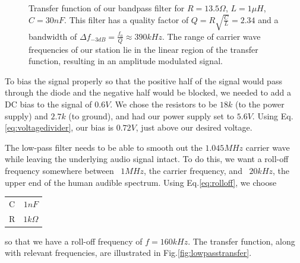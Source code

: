 \documentclass[12pt]{article}
\begin{document}
\begin{figure}[H]
\caption{Transfer function of our bandpass filter for $R =13.5\Omega$, $L=1\mu H$, $C=30nF$. This filter has a quality factor of $Q=R\sqrt{\frac{C}{L}}=2.34$ and a bandwidth of $\Delta f_{-3dB}=\frac{f_0}{Q}\approx 390kHz$. The range of carrier wave frequencies of our station lie in the linear region of the transfer function, resulting in an amplitude modulated signal.}
\label{fig:bandpasstransfer}
\end{figure}

To bias the signal properly so that the positive half of the signal would pass through the diode and the negative half would be blocked, we needed to add a DC bias to the signal of $0.6V$. We chose the resistors to be $18k$ (to the power supply) and $2.7k$ (to ground), and had our power supply set to $5.6V$. Using Eq.\ref{eq:voltagedivider}, our bias is $0.72V$, just above our desired voltage.

The low-pass filter needs to be able to smooth out the $1.045MHz$ carrier wave while leaving the underlying audio signal intact. To do this, we want a roll-off frequency somewhere between ~$1MHz$, the carrier frequency, and ~$20kHz$, the upper end of the human audible spectrum. Using Eq.\ref{eq:rolloff}, we choose

\begin{center}
  \begin{tabular}{ c  c }
    C & $1nF$ \\
    R & $1k\Omega$ 
  \end{tabular}
\end{center}
so that we have a roll-off frequency of $f=160kHz$. The transfer function, along with relevant frequencies, are illustrated in Fig.\ref{fig:lowpasstransfer}.
 
\end{document}

